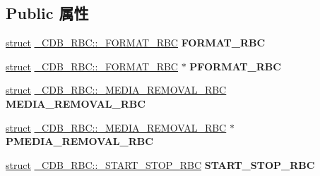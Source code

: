 \subsection*{Public 属性}
\begin{DoxyCompactItemize}
\item 
\mbox{\label{union___c_d_b___r_b_c_acfb2947b2cea20b692ddaef221f1e310}} 
\hyperlink{interfacestruct}{struct} \hyperlink{struct___c_d_b___r_b_c_1_1___f_o_r_m_a_t___r_b_c}{\+\_\+\+C\+D\+B\+\_\+\+R\+B\+C\+::\+\_\+\+F\+O\+R\+M\+A\+T\+\_\+\+R\+BC} {\bfseries F\+O\+R\+M\+A\+T\+\_\+\+R\+BC}
\item 
\mbox{\label{union___c_d_b___r_b_c_a374b2ad66a9d1c39e8134ba85baabce0}} 
\hyperlink{interfacestruct}{struct} \hyperlink{struct___c_d_b___r_b_c_1_1___f_o_r_m_a_t___r_b_c}{\+\_\+\+C\+D\+B\+\_\+\+R\+B\+C\+::\+\_\+\+F\+O\+R\+M\+A\+T\+\_\+\+R\+BC} $\ast$ {\bfseries P\+F\+O\+R\+M\+A\+T\+\_\+\+R\+BC}
\item 
\mbox{\label{union___c_d_b___r_b_c_aaa2320416eb9a8fb4563aa141a3d0f3f}} 
\hyperlink{interfacestruct}{struct} \hyperlink{struct___c_d_b___r_b_c_1_1___m_e_d_i_a___r_e_m_o_v_a_l___r_b_c}{\+\_\+\+C\+D\+B\+\_\+\+R\+B\+C\+::\+\_\+\+M\+E\+D\+I\+A\+\_\+\+R\+E\+M\+O\+V\+A\+L\+\_\+\+R\+BC} {\bfseries M\+E\+D\+I\+A\+\_\+\+R\+E\+M\+O\+V\+A\+L\+\_\+\+R\+BC}
\item 
\mbox{\label{union___c_d_b___r_b_c_ae2ee57e815c02c8b757195d82bd2d758}} 
\hyperlink{interfacestruct}{struct} \hyperlink{struct___c_d_b___r_b_c_1_1___m_e_d_i_a___r_e_m_o_v_a_l___r_b_c}{\+\_\+\+C\+D\+B\+\_\+\+R\+B\+C\+::\+\_\+\+M\+E\+D\+I\+A\+\_\+\+R\+E\+M\+O\+V\+A\+L\+\_\+\+R\+BC} $\ast$ {\bfseries P\+M\+E\+D\+I\+A\+\_\+\+R\+E\+M\+O\+V\+A\+L\+\_\+\+R\+BC}
\item 
\mbox{\label{union___c_d_b___r_b_c_ac0eaee5913d5f73710d12f252a61b62e}} 
\hyperlink{interfacestruct}{struct} \hyperlink{struct___c_d_b___r_b_c_1_1___s_t_a_r_t___s_t_o_p___r_b_c}{\+\_\+\+C\+D\+B\+\_\+\+R\+B\+C\+::\+\_\+\+S\+T\+A\+R\+T\+\_\+\+S\+T\+O\+P\+\_\+\+R\+BC} {\bfseries S\+T\+A\+R\+T\+\_\+\+S\+T\+O\+P\+\_\+\+R\+BC}
\item 
\mbox{\label{union___c_d_b___r_b_c_a83c710ba0f94f61dbc568e98f22f72e9}} 

\end{DoxyCompactItemize}
